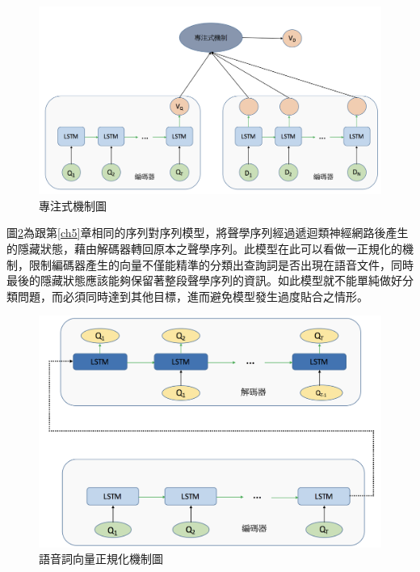 \begin{figure}
\centering
\includegraphics[scale=0.5]{images/ch6_att.png} 
\caption{專注式機制圖}
\label{ch6_att}
\end{figure}
圖\ref{ch6_a2v}為跟第\ref{ch5}章相同的序列對序列模型，將聲學序列經過遞迴類神經網路後產生的隱藏狀態，藉由解碼器轉回原本之聲學序列。此模型在此可以看做一正規化的機制，限制編碼器產生的向量不僅能精準的分類出查詢詞是否出現在語音文件，同時最後的隱藏狀態應該能夠保留著整段聲學序列的資訊。如此模型就不能單純做好分類問題，而必須同時達到其他目標，進而避免模型發生過度貼合之情形。
\begin{figure}
\centering
\includegraphics[scale=0.5]{images/ch6_a2v.png} 
\caption{語音詞向量正規化機制圖}
\label{ch6_a2v}
\end{figure}
